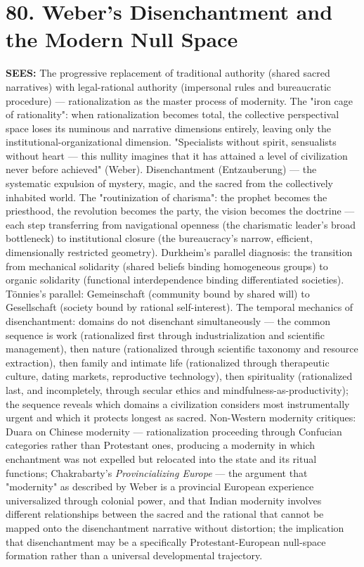 \bigskip\noindent\makebox[\textwidth]{\color{rulegray}\rule{5cm}{0.3pt}}\bigskip


\section*{80. Weber's Disenchantment and the Modern Null Space}


\textbf{SEES:} The progressive replacement of traditional authority (shared sacred narratives) with legal-rational authority (impersonal rules and bureaucratic procedure) — rationalization as the master process of modernity. The "iron cage of rationality": when rationalization becomes total, the collective perspectival space loses its numinous and narrative dimensions entirely, leaving only the institutional-organizational dimension. "Specialists without spirit, sensualists without heart — this nullity imagines that it has attained a level of civilization never before achieved" (Weber). Disenchantment (Entzauberung) — the systematic expulsion of mystery, magic, and the sacred from the collectively inhabited world. The "routinization of charisma": the prophet becomes the priesthood, the revolution becomes the party, the vision becomes the doctrine — each step transferring from navigational openness (the charismatic leader's broad bottleneck) to institutional closure (the bureaucracy's narrow, efficient, dimensionally restricted geometry). Durkheim's parallel diagnosis: the transition from mechanical solidarity (shared beliefs binding homogeneous groups) to organic solidarity (functional interdependence binding differentiated societies). Tönnies's parallel: Gemeinschaft (community bound by shared will) to Gesellschaft (society bound by rational self-interest). The temporal mechanics of disenchantment: domains do not disenchant simultaneously — the common sequence is work (rationalized first through industrialization and scientific management), then nature (rationalized through scientific taxonomy and resource extraction), then family and intimate life (rationalized through therapeutic culture, dating markets, reproductive technology), then spirituality (rationalized last, and incompletely, through secular ethics and mindfulness-as-productivity); the sequence reveals which domains a civilization considers most instrumentally urgent and which it protects longest as sacred. Non-Western modernity critiques: Duara on Chinese modernity — rationalization proceeding through Confucian categories rather than Protestant ones, producing a modernity in which enchantment was not expelled but relocated into the state and its ritual functions; Chakrabarty's \textit{Provincializing Europe} — the argument that "modernity" as described by Weber is a provincial European experience universalized through colonial power, and that Indian modernity involves different relationships between the sacred and the rational that cannot be mapped onto the disenchantment narrative without distortion; the implication that disenchantment may be a specifically Protestant-European null-space formation rather than a universal developmental trajectory.


